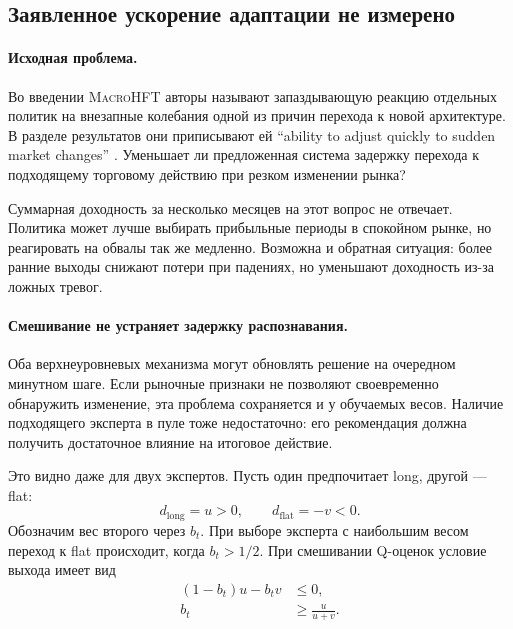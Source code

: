 \documentclass[9pt,a4paper,twocolumn]{extarticle}
\newcommand{\Macro}{\textsc{MacroHFT}}
\begin{document}
\subsection{Заявленное ускорение адаптации не измерено}
\label{sec:adaptation_claim}

\paragraph{Исходная проблема.}

Во введении \Macro{} авторы называют запаздывающую реакцию отдельных политик на внезапные
колебания одной из причин перехода к новой архитектуре. В разделе результатов они приписывают ей
\foreignlanguage{english}{\enquote{ability to adjust quickly to sudden market changes}}
\cite{zong2024macrohft}. Уменьшает ли предложенная система задержку перехода к подходящему
торговому действию при резком изменении рынка?

Суммарная доходность за несколько месяцев на этот вопрос не отвечает. Политика может лучше
выбирать прибыльные периоды в спокойном рынке, но реагировать на обвалы так же медленно.
Возможна и обратная ситуация: более ранние выходы снижают потери при падениях, но уменьшают
доходность из-за ложных тревог.

\paragraph{Смешивание не устраняет задержку распознавания.}

Оба верхнеуровневых механизма могут обновлять решение на очередном минутном шаге. Если рыночные
признаки не позволяют своевременно обнаружить изменение, эта проблема сохраняется и у обучаемых
весов. Наличие подходящего эксперта в пуле тоже недостаточно: его рекомендация должна получить
достаточное влияние на итоговое действие.

Это видно даже для двух экспертов. Пусть один предпочитает long, другой --- flat:
\[
  d_{\mathrm{long}}=u>0,
  \qquad
  d_{\mathrm{flat}}=-v<0.
\]
Обозначим вес второго через $b_t$. При выборе эксперта с наибольшим весом переход к flat
происходит, когда $b_t>1/2$. При смешивании Q-оценок условие выхода имеет вид
\begin{equation}
\begin{aligned}
  (1-b_t)u-b_t v &\leq 0,\\
  b_t &\geq \frac{u}{u+v}.
\end{aligned}
\label{eq:adaptation_threshold}
\end{equation}
\end{document}
